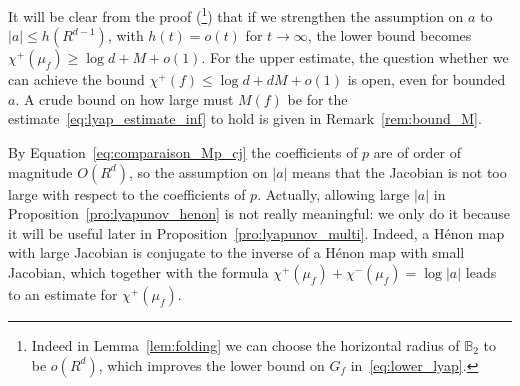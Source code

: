 \documentclass[oneside, 12pt]{amsart}
\newcommand{\abs}[1]{\left\vert#1\right\vert}
\newcommand{\bb}{\mathbb{B}}
\theoremstyle{plain}
\theoremstyle{definition}
\numberwithin{equation}{section}       %
\numberwithin{equation}{section}       %
\begin{document}
 
It will  be clear from the proof (\footnote{Indeed  in  Lemma~\ref{lem:folding} we can choose the horizontal radius of $\bb_2$ to be $o(R^d)$, which improves the lower bound on $G_f$ in~\eqref{eq:lower_lyap}.}) that if we strengthen the assumption on $a$  to 
 $\abs{a}\leq h(R^{d-1})$, with $h(t)  =o(t)$ for $t\to\infty$, the lower bound becomes  
 $\chi^+(\mu_f)\geq  \log  d+     M + o(1)$. 
 For the upper estimate, the question whether   we can achieve the bound 
$\chi^+(f)\leq  \log  d+     dM + o(1)$  is open, even   for bounded $a$. 
 A crude bound on how large must $M(f)$ be for  the estimate~\eqref{eq:lyap_estimate_inf} to hold is given in Remark~\ref{rem:bound_M}. 
 
 By Equation~\eqref{eq:comparaison_Mp_cj}
 the coefficients of $p$ are of order of magnitude  $O(R^d)$, 
 so the assumption on $\abs{a}$  means that the Jacobian is not too large with respect to   the coefficients of $p$. Actually, allowing large $\abs{a}$ in Proposition~\ref{pro:lyapunov_henon} is not really meaningful: 
we only do it because it will be useful later in Proposition~\ref{pro:lyapunov_multi}. Indeed, 
 a Hénon map with large Jacobian is conjugate to the inverse of a Hénon map with small Jacobian, which together with the formula   $\chi^+(\mu_f) + \chi^-(\mu_f)  = \log \abs{a}$ 
 leads to an   estimate  for $\chi^+(\mu_f)$.
\end{document}
